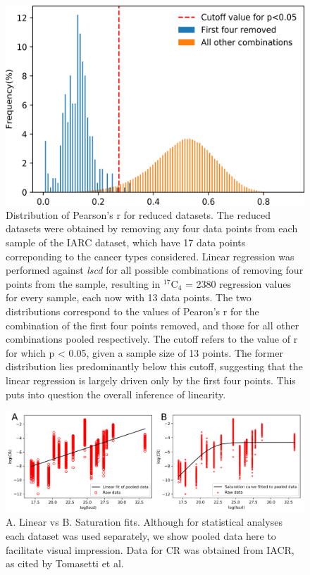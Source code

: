 \documentclass[9pt,onecolumn,twoside]{pnas-new}
\begin{document}
		\begin{figure}[tbhp]
			\centering
			\includegraphics[width=.8\linewidth]{elimination.png}
			\caption[Distribution of Pearson's r for reduced datasets]{Distribution of Pearson's r for reduced datasets. The reduced datasets were obtained by removing any four data points from each sample of the IARC dataset, which have 17 data points correponding to the cancer types considered. Linear regression was performed against \textit{lscd} for all possible combinations of removing four points from the sample, resulting in $^{17}$C$_{4}$ = 2380 regression values for every sample, each now with 13 data points. The two distributions correspond to the values of Pearon's r for the combination of the first four points removed, and those for all other combinations pooled respectively. The cutoff refers to the value of r for which p < 0.05, given a sample size of 13 points. The former distribution lies predominantly below this cutoff, suggesting that the linear regression is largely driven only by the first four points. This puts into question the overall inference of linearity.}
			\label{elimination}
		\end{figure}

		\begin{figure}[tbhp]
			\centering
			\includegraphics[width=.8\linewidth]{figS3-3.png}
			\caption[Distribution of slopes]{A. Linear vs B. Saturation fits. Although for statistical analyses each dataset was used separately, we show pooled data here to facilitate visual impression. Data for CR was obtained from IACR, as cited by Tomasetti et al.}
			\label{figS3-3}
		\end{figure}
\end{document}
